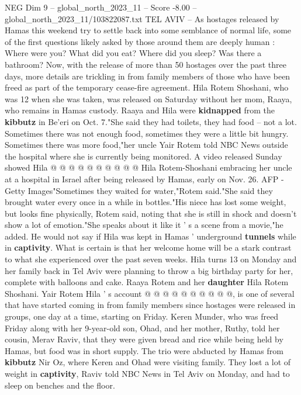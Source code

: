 \begin{textsample}{NEG Dim 9 – global\_north\_2023\_11 – Score -8.00 – global\_north\_2023\_11/103822087.txt}  \label{ex:f9_neg_069}
TEL AVIV -- As hostages released by Hamas this weekend try to settle back into some semblance of normal life, some of the first questions likely asked by those around them are deeply human : Where were you?
What did you eat?
Where did you sleep?
Was there a bathroom?
Now, with the release of more than 50 hostages over the past three days, more details are trickling in from family members of those who have been freed as part of the temporary cease-fire agreement.
Hila Rotem Shoshani, who was 12 when she was taken, was released on Saturday without her mom, Raaya, who remains in Hamas custody.
Raaya and Hila were \textbf{kidnapped} from the \textbf{kibbutz} in Be'eri on Oct. 7."She said they had toilets, they had food -- not a lot.
Sometimes there was not enough food, sometimes they were a little bit hungry.
Sometimes there was more food,"her uncle Yair Rotem told NBC News outside the hospital where she is currently being monitored.
A video released Sunday showed Hila @ @ @ @ @ @ @ @ @ @ Hila Rotem-Shoshani embracing her uncle at a hospital in Israel after being released by Hamas, early on Nov. 26.
AFP - Getty Images"Sometimes they waited for water,"Rotem said."She said they brought water every once in a while in bottles."His niece has lost some weight, but looks fine physically, Rotem said, noting that she is still in shock and doesn't show a lot of emotion."She speaks about it like it ' s a scene from a movie,"he added.
He would not say if Hila was kept in Hamas ' underground \textbf{tunnels} while in \textbf{captivity}.
What is certain is that her welcome home will be a stark contrast to what she experienced over the past seven weeks.
Hila turns 13 on Monday and her family back in Tel Aviv were planning to throw a big birthday party for her, complete with balloons and cake.
Raaya Rotem and her \textbf{daughter} Hila Rotem Shoshani.
Yair Rotem Hila ' s account @ @ @ @ @ @ @ @ @ @, is one of several that have started coming in from family members since hostages were released in groups, one day at a time, starting on Friday.
Keren Munder, who was freed Friday along with her 9-year-old son, Ohad, and her mother, Ruthy, told her cousin, Merav Raviv, that they were given bread and rice while being held by Hamas, but food was in short supply.
The trio were abducted by Hamas from \textbf{kibbutz} Nir Oz, where Keren and Ohad were visiting family.
They lost a lot of weight in \textbf{captivity}, Raviv told NBC News in Tel Aviv on Monday, and had to sleep on benches and the floor.

\end{textsample}
